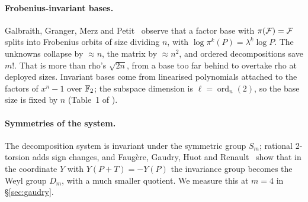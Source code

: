 \paragraph{Frobenius-invariant bases.} Galbraith, Granger, Merz and
Petit~\cite{ggmp2020} observe that a factor base with $\pi(\mathcal{F})=\mathcal{F}$ splits
into Frobenius orbits of size dividing $n$, with
$\log\pi^k(P)=\lambda^k\log P$. The unknowns collapse by $\approx n$, the
matrix by $\approx n^2$, and ordered decompositions save $m!$. That is
more than rho's $\sqrt{2n}$, from a base too far behind to overtake rho at
deployed sizes. Invariant bases come from linearised polynomials attached
to the factors of $x^n-1$ over $\mathbb{F}_2$; the subspace dimension is
$\ell=\operatorname{ord}_n(2)$, so the base size is fixed by $n$
(Table~1 of ).

\paragraph{Symmetries of the system.} The decomposition system is
invariant under the symmetric group $S_m$; rational 2-torsion adds sign
changes, and Faug\`ere, Gaudry, Huot and Renault~\cite{fghr2014} show that
in the coordinate $Y$ with $Y(P+T)=-Y(P)$ the invariance group becomes the
Weyl group $D_m$, with a much smaller quotient. We measure this at $m=4$
in \S\ref{sec:gaudry}.
